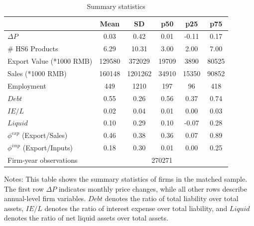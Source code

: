 \begin{table}[htbp]
    \centering
    \caption{Summary statistics}
    \begin{threeparttable}
        \begin{tabular}{lccccc}
        \toprule
                &        Mean&          SD&         p50&         p25&         p75\\
        \midrule
        $\Delta P$        &        0.03&        0.42&        0.01&       -0.11&        0.17\\
        \# HS6 Products           &        6.29&       10.31&        3.00&        2.00&        7.00\\
        Export Value (*1000 RMB)    &   129580&   372029&    19709&     3890&    80525\\
        Sales (*1000 RMB)   &   160148&  1201262&    34910&    15350&    90852\\
        Employment     &      449&     1210&      197&       96&      418\\
        $Debt$              &        0.55&        0.26&        0.56&        0.37&        0.74\\
        $IE/L$               &        0.02&        0.04&        0.01&        0.00&        0.03\\
        $Liquid$       &        0.10 &        0.29 &        0.10 &       -0.07 &        0.28\\
        $\phi^{exp}$ (Export/Sales)         &        0.46&        0.38&        0.36&        0.07&        0.89\\
        $\phi^{imp}$ (Export/Inputs)               &        0.18&        0.30&        0.01&        0.00&        0.25\\
        \midrule
        Firm-year observations        &     \multicolumn{5}{c}{270271}      \\
        \bottomrule
        \end{tabular}
        \begin{tablenotes}
    	\footnotesize
            \item Notes: This table shows the summary statistics of firms in the matched sample. The first row $\Delta P$ indicates monthly price changes, while all other rows describe annual-level firm variables. $Debt$ denotes the ratio of total liability over total assets, $IE/L$ denotes the ratio of interest expense over total liability, and $Liquid$ denotes the ratio of net liquid assets over total assets.
        \end{tablenotes}
    \end{threeparttable}
    \label{tab.summary}
\end{table}

